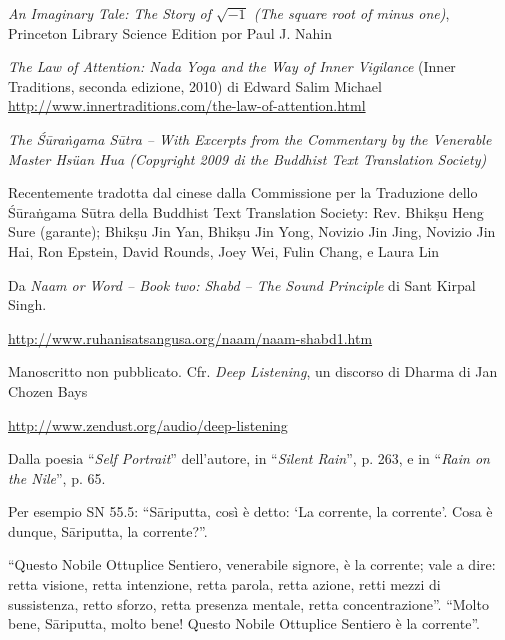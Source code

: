 \begin{thebibliography}{9}

 \emph{An Imaginary Tale: The Story of $\sqrt{-1}$ (The
    square root of minus one)}, Princeton Library Science Edition por Paul J. Nahin

 \emph{The Law of Attention: Nada Yoga and the Way of Inner
    Vigilance} (Inner Traditions, seconda edizione, 2010) di Edward Salim Michael\\[2pt]
  {\fontsize{8}{8}\selectfont \url{http://www.innertraditions.com/the-law-of-attention.html}}

 \emph{The Śūraṅgama Sūtra -- With Excerpts from the
    Commentary by the Venerable Master Hsüan Hua (Copyright 2009 di the
    Buddhist Text Translation Society)}

  Recentemente tradotta dal cinese dalla Commissione per la Traduzione dello
  Śūraṅgama Sūtra della Buddhist Text Translation Society: Rev. Bhikṣu Heng Sure
  (garante); Bhikṣu Jin Yan, Bhikṣu Jin Yong, Novizio Jin Jing, Novizio Jin Hai,
  Ron Epstein, David Rounds, Joey Wei, Fulin Chang, e Laura Lin

 Da \emph{Naam or Word -- Book two: Shabd -- The Sound Principle}
  di Sant Kirpal Singh.

  {\footnotesize \url{http://www.ruhanisatsangusa.org/naam/naam-shabd1.htm}}

 Manoscritto non pubblicato. Cfr. \emph{Deep Listening}, un
  discorso di Dharma di Jan Chozen Bays

  {\footnotesize \url{http://www.zendust.org/audio/deep-listening}}
  
 Dalla poesia ``\emph{Self Portrait}'' dell'autore, in
  ``\emph{Silent Rain}'', p. 263, e in ``\emph{Rain on the Nile}'', p. 65.

 Per esempio SN 55.5: ``Sāriputta, così è detto: `La
  corrente, la corrente'. Cosa è dunque, Sāriputta, la corrente?''.

  ``Questo Nobile Ottuplice Sentiero, venerabile signore, è la corrente; vale a
  dire: retta visione, retta intenzione, retta parola, retta azione, retti mezzi
  di sussistenza, retto sforzo, retta presenza mentale, retta concentrazione''.
  ``Molto bene, Sāriputta, molto bene! Questo Nobile Ottuplice Sentiero è la
  corrente''.

\end{thebibliography}




